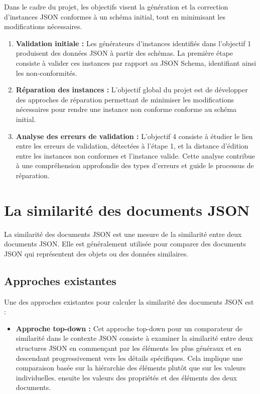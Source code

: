             Dans le cadre du projet, les objectifs visent la génération et la correction d'instances JSON conformes à un schéma initial, tout en minimisant les modifications nécessaires. 

            \begin{enumerate}
                \item \textbf{Validation initiale :} Les générateurs d'instances identifiés dans l'objectif 1 produisent des données JSON à partir des schémas. La première étape consiste à valider ces instances par rapport au JSON Schema, identifiant ainsi les non-conformités.
                
                \item \textbf{Réparation des instances :} L'objectif global du projet est de développer des approches de réparation permettant de minimiser les modifications nécessaires pour rendre une instance non conforme conforme au schéma initial.
                
                \item \textbf{Analyse des erreurs de validation :} L'objectif 4 consiste à étudier le lien entre les erreurs de validation, détectées à l'étape 1, et la distance d'édition entre les instances non conformes et l'instance valide. Cette analyse contribue à une compréhension approfondie des types d'erreurs et guide le processus de réparation.
            \end{enumerate}

    \section{La similarité des documents JSON}
        La similarité des documents JSON est une mesure de la similarité entre deux documents JSON. Elle est généralement utilisée pour comparer des documents JSON qui représentent des objets ou des données similaires.
        \subsection{Approches existantes}
            Une des approches existantes pour calculer la similarité des documents JSON est :
            \begin{itemize}
                \item [\textbullet] \textbf{Approche top-down \cite{JSON_Similarity}:} 
            Cet approche top-down pour un comparateur de similarité dans le contexte JSON consiste à examiner la similarité entre deux structures JSON en commençant par les éléments les plus généraux et en descendant progressivement vers les détails spécifiques. Cela implique une comparaison basée sur la hiérarchie des éléments plutôt que sur les valeurs individuelles. ensuite les valeurs des propriétés et des éléments des deux documents.
            \end{itemize}
